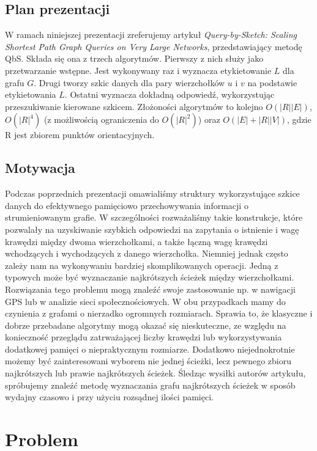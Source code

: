 \documentclass{article}
\theoremstyle{definition}
\begin{document}
    \subsection{Plan prezentacji}
        W ramach niniejszej prezentacji zreferujemy artykuł \textit{Query-by-Sketch: Scaling Shortest Path Graph Queries on Very Large Networks}, przedstawiający metodę QbS. Składa się ona z trzech algorytmów. Pierwszy z nich służy jako przetwarzanie wstępne. Jest wykonywany raz i wyznacza etykietowanie $L$ dla grafu $G$. Drugi tworzy szkic danych dla pary wierzchołków $u$ i $v$ na podstawie etykietowania $L$. Ostatni wyznacza dokładną odpowiedź, wykorzystując przeszukiwanie kierowane szkicem. Złożoności algorytmów to kolejno $O(|R||E|)$, $O(|R|^4)$ (z możliwością ograniczenia do $O(|R|^2)$) oraz $O(|E| + |R||V|)$, gdzie R jest zbiorem punktów orientacyjnych.

    \subsection{Motywacja}
        Podczas poprzednich prezentacji omawialiśmy struktury wykorzystujące szkice danych do efektywnego pamięciowo przechowywania informacji o strumieniowanym grafie. W szczególności rozważaliśmy takie konstrukcje, które pozwalały na uzyskiwanie szybkich odpowiedzi na zapytania o istnienie i wagę krawędzi między dwoma wierzchołkami, a także łączną wagę krawędzi wchodzących i wychodzących z danego wierzchołka. Niemniej jednak często zależy nam na wykonywaniu bardziej skomplikowanych operacji. Jedną z typowych może być wyznaczanie najkrótszych ścieżek między wierzchołkami. Rozwiązania tego problemu mogą znaleźć swoje zastosowanie np. w nawigacji GPS lub w analizie sieci społecznościowych. W obu przypadkach mamy do czynienia z grafami o nierzadko ogromnych rozmiarach. Sprawia to, że klasyczne i dobrze przebadane algorytmy mogą okazać się nieskuteczne, ze względu na konieczność przeglądu zatrważającej liczby krawędzi lub wykorzystywania dodatkowej pamięci o niepraktycznym rozmiarze. Dodatkowo niejednokrotnie możemy być zainteresowani wyborem nie jednej ścieżki, lecz pewnego zbioru najkrótszych lub prawie najkrótszych ścieżek. Śledząc wysiłki autorów artykułu, spróbujemy znaleźć metodę wyznaczania grafu najkrótszych ścieżek w sposób wydajny czasowo i przy użyciu rozsądnej ilości pamięci. 
    
    \section{Problem}
    
\end{document}
